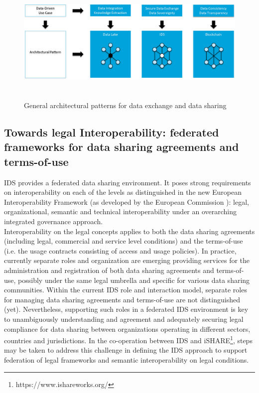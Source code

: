 \begin{figure}[h]
	\begin{Center}
		\includegraphics[width=6.6in,height=2.37in]{./media/image15.png}
		\caption{ General architectural patterns for data exchange and data sharing}
		\label{fig:_general_architectural_patterns_for_data_exchange_and_data_sharing}
	\end{Center}
\end{figure}




\subsection{Towards legal Interoperability: federated frameworks for data sharing agreements and terms-of-use}
\label{subsection:schemeowner}

IDS provides a federated data sharing environment. It poses strong requirements on interoperability on each of the levels as distinguished in the new European Interoperability Framework (as developed by the European Commission ): legal, organizational, semantic and technical interoperability under an overarching integrated governance approach.\\
Interoperability on the legal concepts applies to both the data sharing agreements (including legal, commercial and service level conditions) and the terms-of-use (i.e. the usage contracts consisting of access and usage policies). In practice, currently separate roles and organization are emerging providing services for the administration and registration of both data sharing agreements and terms-of-use, possibly under the same legal umbrella and specific for various data sharing communities. 
Within the current IDS role and interaction model, separate roles for managing data sharing agreements and terms-of-use are not distinguished (yet). Nevertheless, supporting such roles in a federated IDS environment is key to unambiguously understanding and agreement and adequately securing legal compliance for data sharing between organizations operating in different sectors, countries and jurisdictions.
In the co-operation between IDS and iSHARE\footnote{https://www.ishareworks.org/}, steps may be taken to address this challenge in defining the IDS approach to support federation of legal frameworks and semantic interoperability on legal conditions.


